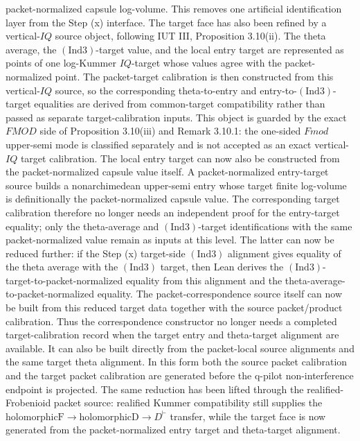 \documentclass[11pt]{article}
\newcommand{\IUT}{IUT}
\newcommand{\Lean}{Lean}
\newcommand{\Ind}{\ensuremath{\mathrm{Ind}}}
\theoremstyle{plain}
\theoremstyle{definition}
\theoremstyle{remark}
\begin{document}
packet-normalized capsule log-volume.  This removes one artificial
identification layer from the Step (x) interface.
The target face has also been refined by a vertical-\(IQ\) source object,
following \IUT{} III, Proposition 3.10(ii).  The theta average, the
\((\Ind3)\)-target value, and the local entry target are represented as points
of one log-Kummer \(IQ\)-target whose values agree with the packet-normalized
point.  The packet-target calibration is then constructed from this
vertical-\(IQ\) source, so the corresponding theta-to-entry and
entry-to-\((\Ind3)\)-target equalities are derived from common-target
compatibility rather than passed as separate target-calibration inputs.
This object is guarded by the exact \(FMOD\) side of Proposition 3.10(iii) and
Remark 3.10.1: the one-sided \(Fmod\) upper-semi mode is classified separately
and is not accepted as an exact vertical-\(IQ\) target calibration.
The local entry target can now also be constructed from the packet-normalized
capsule value itself.  A packet-normalized entry-target source builds a
nonarchimedean upper-semi entry whose target finite log-volume is definitionally
the packet-normalized capsule value.  The corresponding target calibration
therefore no longer needs an independent proof for the entry-target equality;
only the theta-average and \((\Ind3)\)-target identifications with the same
packet-normalized value remain as inputs at this level.
The latter can now be reduced further: if the Step (x) target-side
\((\Ind3)\) alignment gives equality of the theta average with the \((\Ind3)\)
target, then \Lean{} derives the \((\Ind3)\)-target-to-packet-normalized
equality from this alignment and the theta-average-to-packet-normalized
equality.
The packet-correspondence source itself can now be built from this reduced
target data together with the source packet/product calibration.  Thus the
correspondence constructor no longer needs a completed target-calibration
record when the target entry and theta-target alignment are available.
It can also be built directly from the packet-local source alignments and the
same target theta alignment.  In this form both the source packet calibration
and the target packet calibration are generated before the q-pilot
non-interference endpoint is projected.
The same reduction has been lifted through the realified-Frobenioid packet
source: realified Kummer compatibility still supplies the
\(\mathrm{holomorphicF}\to\mathrm{holomorphicD}\to D^\vdash\) transfer, while
the target face is now generated from the packet-normalized entry target and
theta-target alignment.
\end{document}
